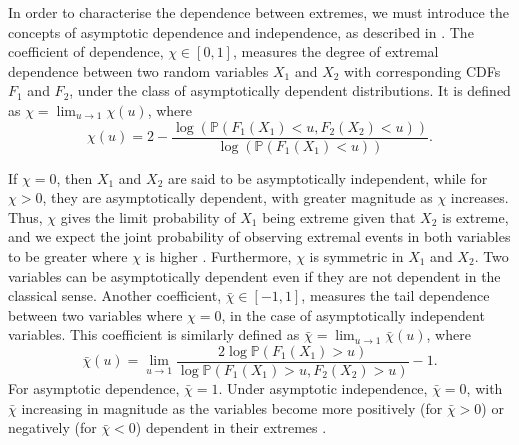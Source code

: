 \documentclass{article}
\numberwithin{equation}{section}
\begin{document}
In order to characterise the dependence between extremes, we must introduce the concepts of asymptotic dependence and independence, as described in \citet{Coles1999}.
The coefficient of dependence, $\chi \in [0, 1]$, measures the degree of extremal dependence between two random variables $X_1$ and $X_2$ with corresponding CDFs $F_1$ and $F_2$, under the class of asymptotically dependent distributions. 
It is defined as $\chi = \lim_{u \rightarrow 1}{\chi(u)}$, where
\[
\chi(u) = 2 - \frac{\log\left(\mathbb{P}(F_1(X_1) < u, F_2(X_2) < u)\right)}{\log \left(\mathbb{P}(F_1(X_1) < u)\right)}.
\]

If $\chi = 0$, then $X_1$ and $X_2$ are said to be asymptotically independent, while for $\chi > 0$, they are asymptotically dependent, with greater magnitude as $\chi$ increases.
Thus, $\chi$ gives the limit probability of $X_1$ being extreme given that $X_2$ is extreme, and we expect the joint probability of observing extremal events in both variables to be greater where $\chi$ is higher \citep{Rohrbeck2021}.
Furthermore, $\chi$ is symmetric in $X_1$ and $X_2$.
Two variables can be asymptotically dependent even if they are not dependent in the classical sense.
Another coefficient, $\bar{\chi} \in [-1, 1]$, measures the tail dependence between two variables where $\chi = 0$, in the case of asymptotically independent variables.
This coefficient is similarly defined as $\bar{\chi} = \lim_{u \rightarrow 1}{\bar{\chi}(u)}$, where
\[
  \bar{\chi}(u) = \lim_{u \rightarrow 1} \frac{2\log\mathbb{P}(F_1(X_1) > u)}{ \log{\mathbb{P}(F_1(X_1) > u, F_2(X_2) > u)}} - 1.
\]
For asymptotic dependence, $\bar{\chi} = 1$.
Under asymptotic independence, $\bar{\chi} = 0$, with $\bar{\chi}$ increasing in magnitude as the variables become more positively (for $\bar{\chi} > 0$) or negatively (for $\bar{\chi} < 0$) dependent in their extremes \citep{Vignotto2021}.
\end{document}
